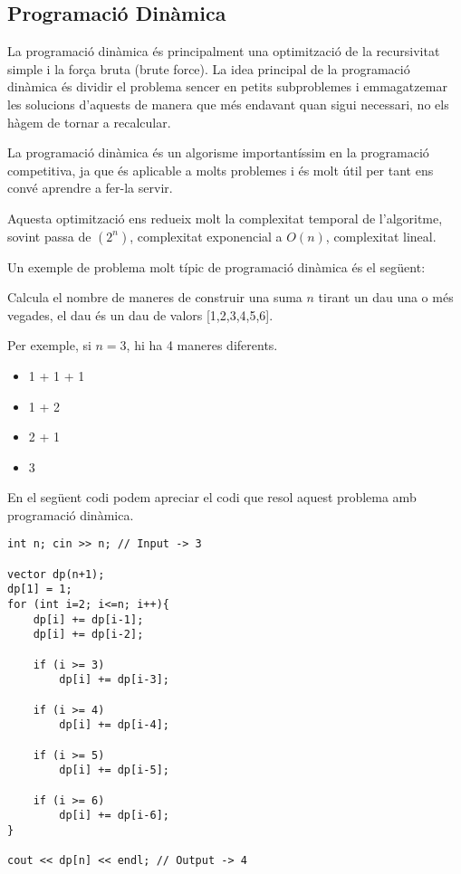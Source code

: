 \subsection{Programació Dinàmica}

La programació dinàmica és principalment una optimització de la recursivitat simple i la força bruta (brute force). La idea principal de la programació dinàmica és dividir el problema sencer en petits subproblemes i emmagatzemar les solucions d'aquests de manera que més endavant quan sigui necessari, no els hàgem de tornar a recalcular. \newline

La programació dinàmica és un algorisme importantíssim en la programació competitiva, ja que és aplicable a molts problemes i és molt útil per tant ens convé aprendre a fer-la servir. \newline

Aquesta optimització ens redueix molt la complexitat temporal de l'algoritme, sovint passa de $(2^n)$, complexitat exponencial a $O(n)$, complexitat lineal. \newline

Un exemple de problema molt típic de programació dinàmica és el següent:

Calcula el nombre de maneres de construir una suma $n$ tirant un dau una o més vegades, el dau és un dau de valors [1,2,3,4,5,6].

Per exemple, si $n = 3$, hi ha 4 maneres diferents.

\begin{itemize}
\item 1 + 1 + 1
\item 1 + 2
\item 2 + 1
\item 3
\end{itemize}

En el següent codi podem apreciar el codi que resol aquest problema amb programació dinàmica. \newpage

\begin{lstlisting}
int n; cin >> n; // Input -> 3

vector dp(n+1);
dp[1] = 1;
for (int i=2; i<=n; i++){
    dp[i] += dp[i-1];
    dp[i] += dp[i-2];
    
    if (i >= 3)
        dp[i] += dp[i-3];
        
    if (i >= 4)
        dp[i] += dp[i-4];
        
    if (i >= 5)
        dp[i] += dp[i-5];
        
    if (i >= 6)
        dp[i] += dp[i-6];
}

cout << dp[n] << endl; // Output -> 4
\end{lstlisting}

